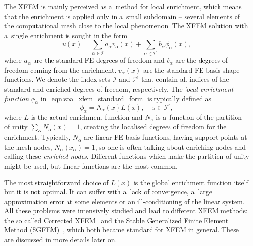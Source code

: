 The XFEM is mainly perceived as a~method for local enrichment, which means that the enrichment is applied only
in a~small subdomain -- several elements of the computational mesh close to the local phenomenon.
The XFEM solution with a~single enrichment is sought in the form
\begin{equation} \label{eqn:soa_xfem_standard_form}
  u(x) = \sum_{\alpha\in\mathcal{I}}a_\alpha v_\alpha(x)
    + \sum_{\alpha\in\mathcal{I}^e} b_{\alpha} \phi_{\alpha}(x),
\end{equation}
where $a_\alpha$ are the standard FE degrees of freedom and $b_{\alpha}$ are the degrees of freedom coming from
the enrichment. $v_\alpha(x)$ are the standard FE basis shape functions. We denote the index sets $\mathcal{I}$ and
$\mathcal{I}^e$ that contain all indices of the standard and enriched degrees of freedom, respectively.
The \emph{local enrichment function} $\phi_{\alpha}$ in~\eqref{eqn:soa_xfem_standard_form} is typically defined as
\begin{equation} \label{eqn:soa_xfem_enrich}
    \phi_{\alpha} = N_\alpha(x)L(x), \quad \alpha\in\mathcal{I}^e,
\end{equation}
where $L$ is the actual enrichment function and $N_\alpha$ is a~function of the partition of unity
$\sum_\alpha N_\alpha(x) = 1$, creating the localised degrees of freedom for the enrichment.
Typically, $N_\alpha$ are linear FE basis functions, having support points at the mesh nodes, $N_\alpha(x_\alpha)=1$,
so one is often talking about enriching nodes and calling these \emph{enriched nodes}.
Different functions which make the partition of unity might be used, but linear functions are the most common.


The most straightforward choice of $L(x)$ is the global enrichment function itself but it is not optimal. It can suffer with a~lack of convergence, a~large approximation error at some elements or an ill-conditioning of the linear system.
All these problems were intensively studied and lead to different XFEM methods:
the so called Corrected XFEM~\cite{fries_corrected_2008}
and the Stable Generalized Finite Element Method (SGFEM)~\cite{babuska_stable_2012, gupta_stable_2013}, which 
both became standard for XFEM in general. These are discussed in more details later on.



